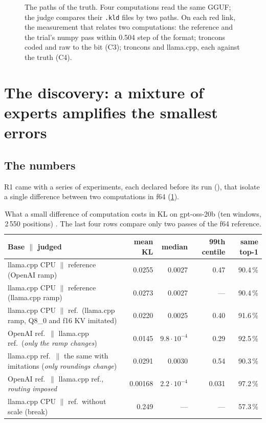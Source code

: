 \begin{figure}[ht]
\centering
\SchemaRefChemins
\caption[The paths of the truth]{The paths of the truth. Four computations read the same GGUF; the judge compares their \texttt{.kld} files by two paths. On each red link, the measurement that relates two computations: the reference and the trial's numpy pass within 0.504 step of the format; troncons coded and raw to the bit (C3); troncons and llama.cpp, each against the truth (C4).}
\label{fig:t2r-chemins}
\end{figure}

\section{The discovery: a mixture of experts amplifies the smallest errors}\label{sec:t2r-amplification}

\subsection{The numbers}

R1 came with a series of experiments, each declared before its run (), that isolate a single difference between two computations in f64 (\cref{tab:t2r-amplification}).

\begin{table}[ht]
\centering\small
\caption[gpt-oss amplifies small errors]{What a small difference of computation costs in KL on gpt-oss-20b (ten windows, 2\,550 positions) \mes. The last four rows compare only two passes of the f64 reference.}
\label{tab:t2r-amplification}
\begin{tabular}{@{}p{6.6cm}rrrr@{}}
\toprule
Base $\|$ judged & mean KL & median & 99th centile & same top-1 \\
\midrule
llama.cpp CPU $\|$ reference (OpenAI ramp) & 0.0255 & 0.0027 & 0.47 & 90.4\,\% \\
llama.cpp CPU $\|$ reference (llama.cpp ramp) & 0.0273 & 0.0027 & --- & 90.4\,\% \\
llama.cpp CPU $\|$ ref.\ (llama.cpp ramp, Q8\_0 and f16 KV imitated) & 0.0220 & 0.0025 & 0.40 & 91.6\,\% \\
\addlinespace
OpenAI ref.\ $\|$ llama.cpp ref.\ (\emph{only the ramp changes}) & 0.0145 & $9.8\cdot10^{-4}$ & 0.29 & 92.5\,\% \\
llama.cpp ref.\ $\|$ the same with imitations (\emph{only roundings change}) & 0.0291 & 0.0030 & 0.54 & 90.3\,\% \\
OpenAI ref.\ $\|$ llama.cpp ref., \emph{routing imposed} & 0.00168 & $2.2\cdot10^{-4}$ & 0.031 & 97.2\,\% \\
llama.cpp CPU $\|$ ref.\ without scale (break) & 0.249 & --- & --- & 57.3\,\% \\
\bottomrule
\end{tabular}
\end{table}

